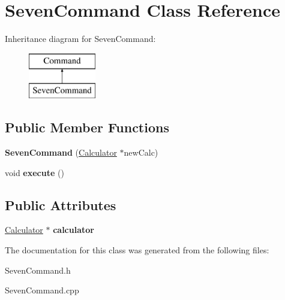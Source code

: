 \hypertarget{class_seven_command}{}\section{Seven\+Command Class Reference}
\label{class_seven_command}
Inheritance diagram for Seven\+Command\+:\begin{figure}[H]
\begin{center}
\leavevmode
\includegraphics[height=2.000000cm]{class_seven_command}
\end{center}
\end{figure}
\subsection*{Public Member Functions}
\begin{DoxyCompactItemize}
\item 
\hypertarget{class_seven_command_a0b3849d60dc9d685e42bc9791a28a1cd}{}{\bfseries Seven\+Command} (\hyperlink{class_calculator}{Calculator} $\ast$new\+Calc)\label{class_seven_command_a0b3849d60dc9d685e42bc9791a28a1cd}

\item 
\hypertarget{class_seven_command_a89ebb0bc60979b8b6d5dc65cc195f38f}{}void {\bfseries execute} ()\label{class_seven_command_a89ebb0bc60979b8b6d5dc65cc195f38f}

\end{DoxyCompactItemize}
\subsection*{Public Attributes}
\begin{DoxyCompactItemize}
\item 
\hypertarget{class_seven_command_a5758d5e5b5981f81bd56c54c87f25b48}{}\hyperlink{class_calculator}{Calculator} $\ast$ {\bfseries calculator}\label{class_seven_command_a5758d5e5b5981f81bd56c54c87f25b48}

\end{DoxyCompactItemize}


The documentation for this class was generated from the following files\+:\begin{DoxyCompactItemize}
\item 
Seven\+Command.\+h\item 
Seven\+Command.\+cpp\end{DoxyCompactItemize}
